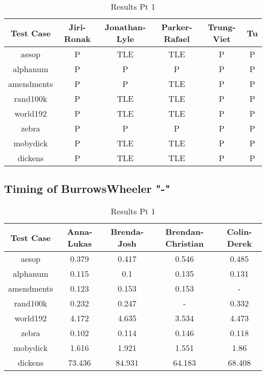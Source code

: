 \documentclass[12pt]{article}
\begin{document}
\begin{table}[ht]
\caption{Results Pt 1}%
\centering %
\begin{tabular}{c c c c c c}%
\hline \hline                        %
Test Case & Jiri-Ronak & Jonathan-Lyle & Parker-Rafael & Trung-Viet & Tu \\ [0.5ex]%
\hline                  %
aesop & P & TLE & TLE & P & P\\
alphanum & P & P & P & P & P\\
amendments & P & P & TLE & P & P \\
rand100k & P & TLE & TLE & P & P\\
world192 & P & TLE & TLE & P & P\\
zebra & P & P & P & P & P\\
mobydick & P & TLE & TLE & P & P \\
dickens & P & TLE & TLE & P & P\\
\hline                  %
\end{tabular}
\label{table:nonlin}
\end{table}




\newpage
\subsection{Timing of BurrowsWheeler "-"}
\begin{table}[ht]
\caption{Results Pt 1}%
\centering %
\begin{tabular}{c c c c c}%
\hline \hline
Test Case & Anna-Lukas & Brenda-Josh & Brendan-Christian & Colin-Derek \\ [0.5ex]%
\hline                  %
aesop & 0.379 & 0.417 & 0.546 & 0.485 \\
alphanum & 0.115 & 0.1 & 0.135 & 0.131 \\
amendments & 0.123 & 0.153 & 0.153 & - \\
rand100k & 0.232 & 0.247 & - & 0.332 \\
world192 & 4.172 & 4.635 & 3.534 & 4.473 \\
zebra & 0.102 & 0.114 & 0.146 & 0.118 \\
mobydick & 1.616 & 1.921 & 1.551 & 1.86 \\
dickens & 73.436 & 84.931 & 64.183 & 68.408 \\
\hline                  %
\end{tabular}
\label{table:nonlin}
\end{table}
\end{document}
